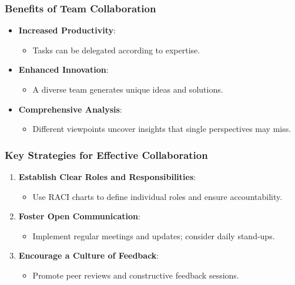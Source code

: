 \documentclass[aspectratio=169]{beamer}
\begin{document}
\begin{frame}[fragile]
  \frametitle{Benefits of Team Collaboration}
  \begin{itemize}
    \item \textbf{Increased Productivity}:
      \begin{itemize}
        \item Tasks can be delegated according to expertise.
      \end{itemize}
    \item \textbf{Enhanced Innovation}:
      \begin{itemize}
        \item A diverse team generates unique ideas and solutions.
      \end{itemize}
    \item \textbf{Comprehensive Analysis}:
      \begin{itemize}
        \item Different viewpoints uncover insights that single perspectives may miss.
      \end{itemize}
  \end{itemize}
\end{frame}

\begin{frame}[fragile]
  \frametitle{Key Strategies for Effective Collaboration}
  \begin{enumerate}
    \item \textbf{Establish Clear Roles and Responsibilities}:
      \begin{itemize}
        \item Use RACI charts to define individual roles and ensure accountability.
      \end{itemize}
  
    \item \textbf{Foster Open Communication}:
      \begin{itemize}
        \item Implement regular meetings and updates; consider daily stand-ups.
      \end{itemize}

    \item \textbf{Encourage a Culture of Feedback}:
      \begin{itemize}
        \item Promote peer reviews and constructive feedback sessions.
      \end{itemize}
  \end{enumerate}
\end{frame}
\end{document}
